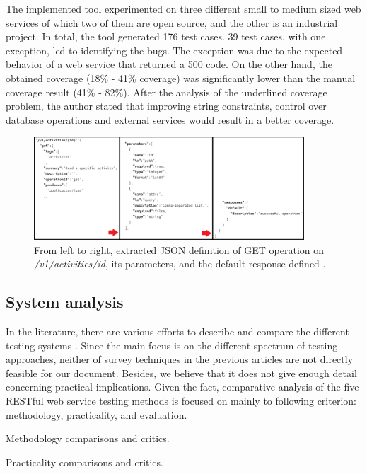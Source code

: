 \documentclass[english]{tktltiki}
\begin{document}
The implemented tool experimented on three different small to medium sized web services of which two of them are open source, and the other is an industrial project. In total, the tool generated 176 test cases. 39 test cases, with one exception, led to identifying the bugs. The exception was due to the expected behavior of a web service that returned a 500 code. On the other hand, the obtained coverage (18\% - 41\% coverage) was significantly lower than the manual coverage result (41\% - 82\%). After the analysis of the underlined coverage problem, the author stated that improving string constraints, control over database operations and external services would result in a better coverage.
\begin{figure}[h]
	\begin{center}
		\includegraphics[width=0.9\textwidth]{images/swagger_c.png}
		\caption{From left to right, extracted JSON definition of GET operation on \textit{/v1/activities/{id}}, its parameters, and the default response defined \cite{arcuri2017restful}. }
		\label{fig:swagger}
	\end{center}
\end{figure}
\subsection{System analysis}
In the literature, there are various efforts to describe and compare the different testing systems \cite{canfora2006testing, canfora2009service, bozkurt2013testing}. Since the main focus is on the different spectrum of testing approaches, neither of survey techniques in the previous articles are not directly feasible for our document. Besides, we believe that it does not give enough detail concerning practical implications. Given the fact, comparative analysis of the five RESTful web service testing methods is focused on mainly to following criterion: methodology, practicality, and evaluation.

Methodology comparisons and critics.

Practicality comparisons and critics.
\end{document}
